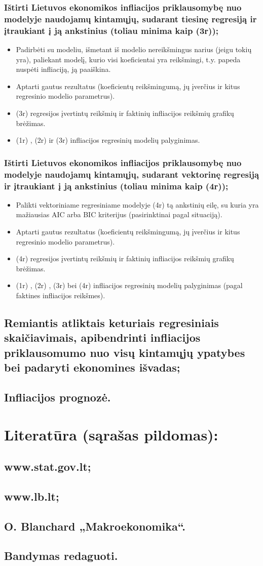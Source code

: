 \documentclass[a4paper]{article}
\begin{document}
\subsubsection{Ištirti Lietuvos ekonomikos infliacijos priklausomybę nuo modelyje naudojamų kintamųjų, sudarant tiesinę regresiją ir  įtraukiant į ją ankstinius (toliau minima kaip (3r));}
\begin{itemize}
\item Padirbėti su modeliu, išmetant iš modelio nereikšmingus narius (jeigu tokių yra), paliekant modelį, kurio visi koeficientai yra reikšmingi, t.y. papeda nuspėti infliaciją, ją paaiškina.
\item Aptarti gautus rezultatus (koeficientų reikšmingumą, jų įverčius ir kitus regresinio modelio parametrus).
\item (3r) regresijos įvertintų reikšmių ir faktinių infliacijos reikšmių grafikų brėžimas.
\item (1r) , (2r) ir (3r) infliacijos regresinių modelių palyginimas.
\end{itemize}
\subsubsection{Ištirti Lietuvos ekonomikos infliacijos priklausomybę nuo modelyje naudojamų kintamųjų, sudarant vektorinę regresiją ir įtraukiant į ją ankstinius (toliau minima kaip (4r));}
\begin{itemize}
\item Palikti vektoriniame regresiniame  modelyje (4r)  tą ankstinių eilę, su kuria yra mažiausias AIC arba BIC kriterijus (pasirinktinai pagal situaciją).
\item Aptarti gautus rezultatus (koeficientų reikšmingumą, jų įverčius ir kitus regresinio modelio parametrus).
\item (4r) regresijos įvertintų reikšmių ir faktinių infliacijos reikšmių grafikų brėžimas.
\item (1r) , (2r) , (3r) bei (4r) infliacijos regresinių modelių palyginimas (pagal faktines infliacijos reikšmes).
\end{itemize}
\subsection{Remiantis atliktais keturiais regresiniais skaičiavimais, apibendrinti infliacijos priklausomumo  nuo visų kintamųjų ypatybes bei padaryti ekonomines išvadas;}
\subsection{	Infliacijos prognozė.}
\section{Literatūra (sąrašas pildomas):}
\subsection {www.stat.gov.lt;} 
\subsection{www.lb.lt;}
\subsection{O. Blanchard  „Makroekonomika“.}
\subsection{Bandymas redaguoti.}
\end{document}
